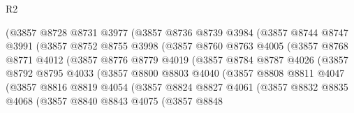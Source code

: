\begin{lexlean}{R2}
\begin{coremodule}
                    (@3857
                      @8728
                      @8731
                      @3977
                      (@3857
                        @8736
                        @8739
                        @3984
                        (@3857
                          @8744
                          @8747
                          @3991
                          (@3857
                            @8752
                            @8755
                            @3998
                            (@3857
                              @8760
                              @8763
                              @4005
                              (@3857
                                @8768
                                @8771
                                @4012
                                (@3857
                                  @8776
                                  @8779
                                  @4019
                                  (@3857
                                    @8784
                                    @8787
                                    @4026
                                    (@3857
                                      @8792
                                      @8795
                                      @4033
                                      (@3857
                                        @8800
                                        @8803
                                        @4040
                                        (@3857
                                          @8808
                                          @8811
                                          @4047
                                          (@3857
                                            @8816
                                            @8819
                                            @4054
                                            (@3857
                                              @8824
                                              @8827
                                              @4061
                                              (@3857
                                                @8832
                                                @8835
                                                @4068
                                                (@3857
                                                  @8840
                                                  @8843
                                                  @4075
                                                  (@3857
                                                    @8848

\end{coremodule}
\end{lexlean}
